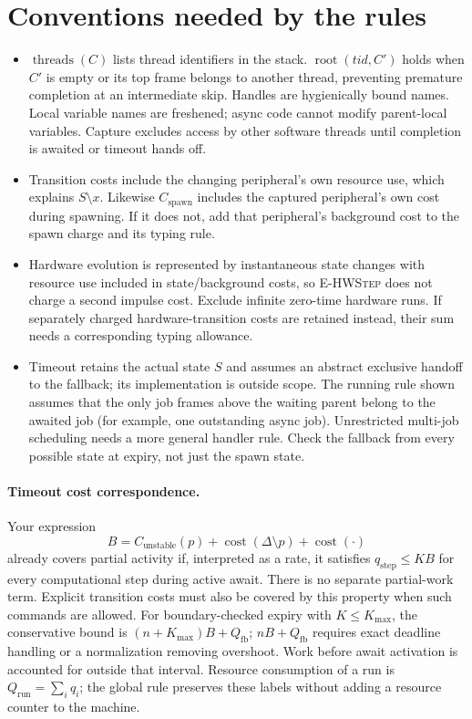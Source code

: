 \documentclass[11pt]{article}
\newcommand{\m}[1]{\operatorname{#1}}
\begin{document}
\section{Conventions needed by the rules}
\begin{itemize}
\item $\m{threads}(C)$ lists thread identifiers in the stack.
$\m{root}(tid,C')$ holds when $C'$ is empty or its top frame belongs to another
thread, preventing premature completion at an intermediate skip.
Handles are hygienically bound names. Local variable names are freshened;
async code cannot modify parent-local variables. Capture excludes access by
other software threads until completion is awaited or timeout hands off.
\item Transition costs include the changing peripheral's own resource use,
which explains $S\setminus x$. Likewise $C_{\text{spawn}}$ includes the
captured peripheral's own cost during spawning. If it does not, add that
peripheral's background cost to the spawn charge and its typing rule.
\item Hardware evolution is represented by instantaneous state changes with
resource use included in state/background costs, so \textsc{E-HWStep} does not
charge a second impulse cost. Exclude infinite zero-time hardware runs.
If separately charged hardware-transition costs are retained instead, their
sum needs a corresponding typing allowance.
\item Timeout retains the actual state $S$ and assumes an abstract exclusive
handoff to the fallback; its implementation is outside scope. The running
rule shown assumes that the only job frames above the waiting parent belong
to the awaited job (for example, one outstanding async job). Unrestricted
multi-job scheduling needs a more general handler rule. Check the fallback
from every possible state at expiry, not just the spawn state.
\end{itemize}

\paragraph{Timeout cost correspondence.}
Your expression
\[
B=C_{\text{unstable}}(p)+\m{cost}(\Delta\setminus p)+\m{cost}(\cdot)
\]
already covers partial activity if, interpreted as a rate, it satisfies
$q_{\text{step}}\leq KB$ for every computational step during active await.
There is no separate partial-work term. Explicit transition costs must also
be covered by this property when such commands are allowed.
For boundary-checked expiry with $K\leq K_{\max}$, the conservative bound is
$(n+K_{\max})B+Q_{\text{fb}}$; $nB+Q_{\text{fb}}$ requires exact deadline
handling or a normalization removing overshoot. Work before await activation
is accounted for outside that interval. Resource consumption of a run is
$Q_{\text{run}}=\sum_i q_i$; the global rule preserves these labels without
adding a resource counter to the machine.
\end{document}
